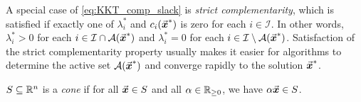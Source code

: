 
A special case of \eqref{eq:KKT_comp_slack} is \emph{strict complementarity}, which is satisfied if exactly one of \(\lambda_{i}^{\ast}\) and \(c_{i}(\vec{\boldsymbol{x}}^{\ast})\) is zero for each \(i\in\mathcal{I}\).
In other words, \(\lambda_{i}^{\ast} > 0\) for each \(i\in\mathcal{I} \cap \mathcal{A}(\vec{\boldsymbol{x}}^{\ast})\) and \(\lambda_{i}^{\ast} = 0\) for each \(i\in\mathcal{I} \setminus \mathcal{A}(\vec{\boldsymbol{x}}^{\ast})\).
Satisfaction of the strict complementarity property usually makes it easier for algorithms to determine the active set \(\mathcal{A}(\vec{\boldsymbol{x}}^{\ast})\) and converge rapidly to the solution \(\vec{\boldsymbol{x}}^{\ast}\).

\begin{definition}[Cone]\label{def:cone}
  \(S\subseteq\mathbb{R}^{n}\) is a \emph{cone} if for all \(\vec{\boldsymbol{x}}\in S\) and all \(\alpha \in \mathbb{R}_{\ge 0}\), we have \(\alpha \vec{\boldsymbol{x}} \in S\).
\end{definition}

